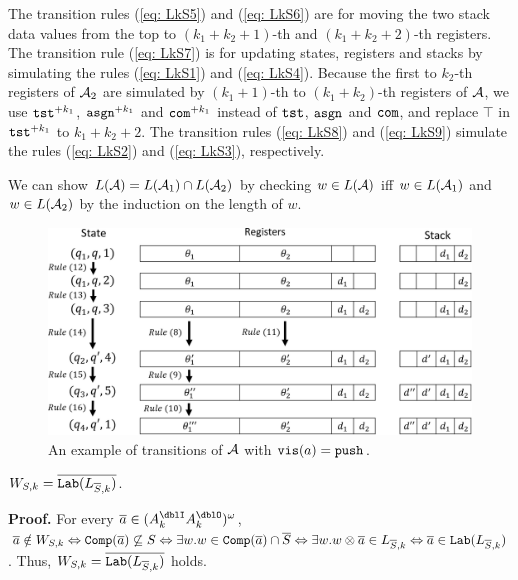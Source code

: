 The transition rules (\ref{eq: LkS5}) and (\ref{eq: LkS6})
are for moving the two stack data values from the top
to $(k_1+k_2+1)$-th and $(k_1+k_2+2)$-th registers.
The transition rule (\ref{eq: LkS7})
is for updating states, registers and stacks
by simulating the rules (\ref{eq: LkS1}) and (\ref{eq: LkS4}).
Because the first to $k_2$-th registers of ${\cal A}_2$ are simulated by $(k_1+1)$-th to $(k_1+k_2)$-th registers of ${\cal A}$,
we use $\mathtt{tst}^{+k_1}$, $\mathtt{asgn}^{+k_1}$ and $\mathtt{com}^{+k_1}$
instead of $\mathtt{tst}$, $\mathtt{asgn}$ and $\mathtt{com}$, and
replace $\top$ in $\mathtt{tst}^{+k_1}$ to $k_1+k_2+2$.
The transition rules (\ref{eq: LkS8}) and (\ref{eq: LkS9})
simulate the rules (\ref{eq: LkS2}) and (\ref{eq: LkS3}), respectively.

We can show $L({\cal A})=L({\cal A}_1)\cap L({\cal A}_2)$
by checking $w\in L({\cal A})$ iff $w\in L({\cal A}_1)$ and $w\in L({\cal A}_2)$ by the induction on the length of $w$.
\begin{figure}[t]
  \centering
  \includegraphics[width=12cm]{lem_LkS.png}
  \caption{An example of transitions of ${\cal A}$ with $\mathtt{vis}(a)=\mathtt{push}$.}
  \label{fig: lem_LkS}
\end{figure}

\begin{lemma} \label{lem: W=lab}
$W_{S,k} = \overline{\mathtt{Lab}(L_{{\overline{S}},k})}$.
\end{lemma}
{\bf Proof.}\quad
For every $\overa\in(A_k^\dblI A_k^\dblO)^\omega$,
${\overline{a}}\notin W_{S,k} \Leftrightarrow {\mathtt{Comp}}({\overline{a}})\not\subseteq S
\Leftrightarrow \exists w. w\in {\mathtt{Comp}}({\overline{a}})\cap {\overline{S}}
\Leftrightarrow \exists w. w\otimes{\overline{a}}\in L_{{\overline{S}},k}
\Leftrightarrow {\overline{a}}\in\mathtt{Lab}(L_{{\overline{S}},k})$.
Thus, $W_{S,k} = \overline{\mathtt{Lab}(L_{{\overline{S}},k})}$ holds.

